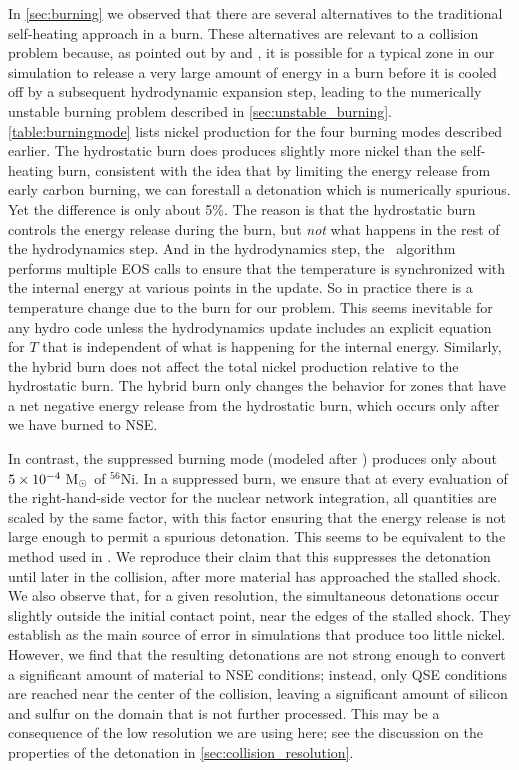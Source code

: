 \documentclass[12pt]{article}
\begin{document}
In \autoref{sec:burning} we observed that there are several alternatives to the traditional
self-heating approach in a burn. These alternatives are relevant to a collision problem because,
as pointed out by \cite{raskin:2010} and \cite{kushnir:2013}, it is possible for a typical
zone in our simulation to release a very large amount of energy in a burn before it is cooled
off by a subsequent hydrodynamic expansion step, leading to the numerically unstable burning
problem described in \autoref{sec:unstable_burning}. \autoref{table:burningmode} lists nickel
production for the four burning modes described earlier. The hydrostatic burn does produces
slightly more nickel than the self-heating burn, consistent with the idea that by limiting the
energy release from early carbon burning, we can forestall a detonation which is numerically
spurious. Yet the difference is only about 5\%. The reason is that the hydrostatic burn controls
the energy release during the burn, but \textit{not} what happens in the rest of the hydrodynamics
step. And in the hydrodynamics step, the \castro\ algorithm performs multiple EOS calls to ensure
that the temperature is synchronized with the internal energy at various points in the update.
So in practice there is a temperature change due to the burn for our problem. This seems inevitable
for any hydro code unless the hydrodynamics update includes an explicit equation for $T$ that is
independent of what is happening for the internal energy. Similarly, the hybrid burn does not
affect the total nickel production relative to the hydrostatic burn. The hybrid burn only changes
the behavior for zones that have a net negative energy release from the hydrostatic burn, which
occurs only after we have burned to NSE.



In contrast, the suppressed burning mode (modeled after \citet{kushnir:2013}) produces only about
$5 \times 10^{-4}\ \mathrm{M}_\odot$ of $^{56}$Ni. In a suppressed burn, we ensure that at every evaluation
of the right-hand-side vector for the nuclear network integration, all quantities are scaled by the
same factor, with this factor ensuring that the energy release is not large enough to permit a
spurious detonation. This seems to be equivalent to the method used in \citet{kushnir:2013}. We
reproduce their claim that this suppresses the detonation until later in the collision, after more
material has approached the stalled shock. We also observe that, for a given resolution, the simultaneous
detonations occur slightly outside the initial contact point, near the edges of the stalled shock. They
establish as the main source of error in simulations that produce too little nickel. However, we find
that the resulting detonations are not strong enough to convert a significant amount of material to NSE
conditions; instead, only QSE conditions are reached near the center of the collision, leaving a significant
amount of silicon and sulfur on the domain that is not further processed. This may be a consequence of
the low resolution we are using here; see the discussion on the properties of the detonation in
\autoref{sec:collision_resolution}.
\end{document}
